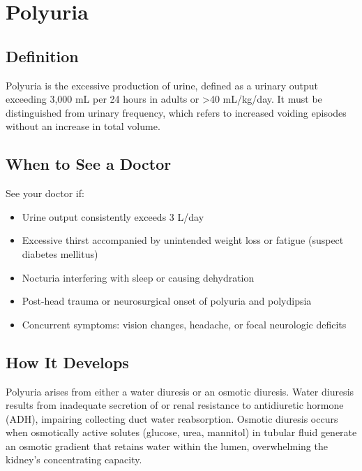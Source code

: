 \chapter{Polyuria}

\section*{Definition}
Polyuria is the excessive production of urine, defined as a urinary output exceeding 3,000 mL per 24 hours in adults or >40 mL/kg/day. It must be distinguished from urinary frequency, which refers to increased voiding episodes without an increase in total volume.

\section*{When to See a Doctor}
See your doctor if:
\begin{itemize}
  \item Urine output consistently exceeds 3 L/day
  \item Excessive thirst accompanied by unintended weight loss or fatigue (suspect diabetes mellitus)
  \item Nocturia interfering with sleep or causing dehydration
  \item Post-head trauma or neurosurgical onset of polyuria and polydipsia
  \item Concurrent symptoms: vision changes, headache, or focal neurologic deficits
\end{itemize}

\section*{How It Develops}
Polyuria arises from either a water diuresis or an osmotic diuresis. Water diuresis results from inadequate secretion of or renal resistance to antidiuretic hormone (ADH), impairing collecting duct water reabsorption. Osmotic diuresis occurs when osmotically active solutes (glucose, urea, mannitol) in tubular fluid generate an osmotic gradient that retains water within the lumen, overwhelming the kidney's concentrating capacity.

